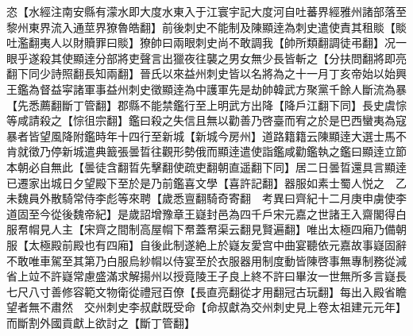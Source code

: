 恣【水經注南安縣有濛水即大度水東入于江寰宇記大度河自吐蕃界經雅州諸部落至黎州東界流入通莖界獠魯皓翻】前後刺史不能制及陳顯逹為刺史遣使責其租賧【賧吐濫翻夷人以財贖罪曰賧】獠帥曰兩眼刺史尚不敢調我【帥所類翻調徒弔翻】况一眼乎遂殺其使顯逹分部將吏聲言出獵夜往襲之男女無少長皆斬之【分扶問翻將即亮翻下同少詩照翻長知兩翻】晉氏以來益州刺史皆以名將為之十一月丁亥帝始以始興王鑑為督益寜諸軍事益州刺史徵顯逹為中護軍先是劫帥韓武方聚黨千餘人斷流為暴【先悉薦翻斷丁管翻】郡縣不能禁鑑行至上明武方出降【降戶江翻下同】長史虞悰等咸請殺之【悰徂宗翻】鑑曰殺之失信且無以勸善乃啓臺而宥之於是巴西蠻夷為寇暴者皆望風降附鑑時年十四行至新城【新城今房州】道路籍籍云陳顯逹大選士馬不肯就徵乃停新城遣典籖張曇晢往觀形勢俄而顯逹遣使詣鑑咸勸鑑執之鑑曰顯逹立節本朝必自無此【曇徒含翻晢先擊翻使疏吏翻朝直遥翻下同】居二日曇晢還具言顯逹已遷家出城日夕望殿下至於是乃前鑑喜文學【喜許記翻】器服如素士蜀人悦之　乙未魏員外散騎常侍李彪等來聘【歲悉亶翻騎奇寄翻　考異曰齊紀十二月庚申虜使李道固至今從後魏帝紀】是歲詔增豫章王嶷封邑為四千戶宋元嘉之世諸王入齋閣得白服帬㡌見人主【宋齊之間制高屋㡌下帬蓋帬渠云翻見賢遍翻】唯出太極四廂乃備朝服【太極殿前殿也有四廂】自後此制遂絶上於嶷友愛宫中曲宴聽依元嘉故事嶷固辭不敢唯車駕至其第乃白服烏紗㡌以侍宴至於衣服器用制度動皆陳啓事無專制務從減省上竝不許嶷常慮盛滿求解揚州以授竟陵王子良上終不許曰畢汝一世無所多言嶷長七尺八寸善修容範文物衛從禮冠百僚【長直亮翻從才用翻冠古玩翻】每出入殿省瞻望者無不肅然　交州刺史李叔獻既受命【命叔獻為交州刺史見上卷太祖建元元年】而斷割外國貢獻上欲討之【斷丁管翻】

